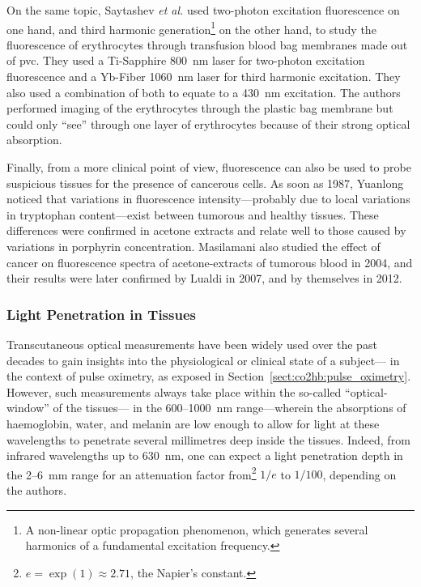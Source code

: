 On the same topic, Saytashev \textit{et al.}\cite{saytashev2016} used two-photon excitation fluorescence on one hand, and third harmonic generation\footnote{A non-linear optic propagation phenomenon, which generates several harmonics of a fundamental excitation frequency.} on the other hand, to study the fluorescence of erythrocytes through transfusion blood bag membranes made out of \gls{pvc}. They used a Ti-Sapphire 800~nm laser for two-photon excitation fluorescence and a Yb-Fiber 1060~nm laser for third harmonic excitation. They also used a combination of both to equate to a 430~nm excitation. The authors performed imaging of the erythrocytes through the plastic bag membrane but could only \enquote{see} through one layer of erythrocytes because of their strong optical absorption.

Finally, from a more clinical point of view, fluorescence can also be used to probe suspicious tissues for the presence of cancerous cells. As soon as 1987, Yuanlong \etal{}\cite{yuanlong1987} noticed that variations in fluorescence intensity---probably due to local variations in tryptophan content---exist between tumorous and healthy tissues. These differences were confirmed in acetone extracts and relate well to those caused by variations in porphyrin concentration. Masilamani \etal{} also studied the effect of cancer on fluorescence spectra of acetone-extracts of tumorous blood in 2004\cite{masilamani2004}, and their results were later confirmed by Lualdi \etal{} in 2007\cite{lualdi2007}, and by themselves in 2012\cite{masilamani2012}.


\subsubsection{Light Penetration in Tissues}\label{sect:co2hb:light_pene}

Transcutaneous optical measurements have been widely used over the past decades to gain insights into the physiological or clinical state of a subject---\eg{} in the context of pulse oximetry, as exposed in Section~\ref{sect:co2hb:pulse_oximetry}. However, such measurements always take place within the so-called \enquote{optical-window} of the tissues---\ie{} in the 600--1000~nm range---wherein the absorptions of haemoglobin, water, and melanin are low enough to allow for light at these wavelengths to penetrate several millimetres deep inside the tissues. Indeed, from infrared wavelengths up to 630~nm, one can expect a light penetration depth in the 2--6~mm range for an attenuation factor from\footnote{$e = \exp(1)\approx 2.71$, the Napier's constant.} $1/e$ to $1/100$, depending on the authors\cite{wilson1985, melo2001, ash2017}.


